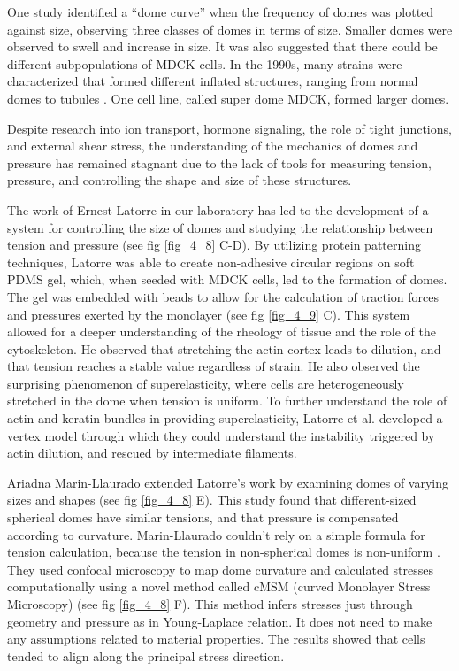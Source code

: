 One study \cite{popowicz1986} identified a ``dome curve'' when the frequency of domes was plotted against size, observing three classes of domes in terms of size. Smaller domes were observed to swell and increase in size. It was also suggested that there could be different subpopulations of MDCK cells. In the 1990s, many strains were characterized that formed different inflated structures, ranging from normal domes to tubules \cite{klebe1995}. One cell line, called super dome MDCK, formed larger domes.

Despite research into ion transport, hormone signaling, the role of tight junctions, and external shear stress, the understanding of the mechanics of domes and pressure has remained stagnant due to the lack of tools for measuring tension, pressure, and controlling the shape and size of these structures.

The work of Ernest Latorre in our laboratory has led to the development of a system for controlling the size of domes and studying the relationship between tension and pressure \cite{latorre2018} (see fig \ref{fig_4_8} C-D). By utilizing protein patterning techniques, Latorre was able to create non-adhesive circular regions on soft PDMS gel, which, when seeded with MDCK cells, led to the formation of domes. The gel was embedded with beads to allow for the calculation of traction forces and pressures exerted by the monolayer (see  fig \ref{fig_4_9} C). This system allowed for a deeper understanding of the rheology of tissue and the role of the cytoskeleton. He observed that stretching the actin cortex leads to dilution, and that tension reaches a stable value regardless of strain. He also observed the surprising phenomenon of superelasticity, where cells are heterogeneously stretched in the dome when tension is uniform. To further understand the role of actin and keratin bundles in providing superelasticity, Latorre et al. developed a vertex model through which they could understand the instability triggered by actin dilution, and rescued by intermediate filaments.

Ariadna Marin-Llaurado extended Latorre's work by examining domes of varying sizes and shapes (see fig \ref{fig_4_8} E). This study found that different-sized spherical domes have similar tensions, and that pressure is compensated according to curvature. Marin-Llaurado couldn't rely on a simple formula for tension calculation, because the tension in non-spherical domes is non-uniform \cite{marin-llaurado2022}. They used confocal microscopy to map dome curvature and calculated stresses computationally using a novel method called cMSM (curved Monolayer Stress Microscopy) (see fig \ref{fig_4_8} F). This method infers stresses just through geometry and pressure as in Young-Laplace relation. It does not need to make any assumptions related to material properties. The results showed that cells tended to align along the principal stress direction.

